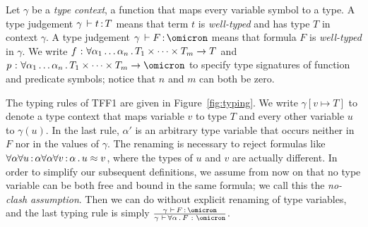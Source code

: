 Let $\gamma$ be a {\em type context}, a function that maps
every variable symbol to a type.
A type judgement $\gamma \,\vdash t \operatorname{:} T$ means that term $t$
is {\em well-typed\/} and has type $T$ in context $\gamma$.
A type judgement $\gamma \,\vdash F \ty \omicron$ means that formula $F$
is {\em well-typed\/} in $\gamma$.
We write $f \,\operatorname{:}\, \forall \alpha_1\dots\alpha_n \,.\,
T_1 \times \dots \times T_m \to T$ and
$p \,\ty\, \forall \alpha_1\dots\alpha_n \,.\,
T_1 \times \dots \times T_m \to \omicron$ to specify
type signatures of function and predicate symbols;
notice that $n$ and $m$ can both be zero.

The typing rules of TFF1 are given in Figure~\ref{fig:typing}.
We write $\gamma[v \mapsto T]$ to denote a type context that maps
variable $v$ to type $T$ and every other variable $u$ to $\gamma(u)$.
In the last rule, $\alpha'$ is an arbitrary type variable that
occurs neither in $F$ nor in the values of $\gamma$.
The renaming is necessary to reject formulas like
$\forall\alpha\forall u\operatorname{:}\alpha\forall\alpha\forall v\operatorname{:}\alpha \,.\,
u \approx v$, where the types of $u$ and $v$ are actually different.
In order to simplify our subsequent definitions, we assume from now on
that no type variable can be both free and bound in the same formula;
we call this the {\em no-clash assumption}.
Then we can do without explicit renaming of type variables,
and the last typing rule is simply
$\frac{\gamma\, \,\vdash\, F \ty \omicron}{
\gamma\, \,\vdash\, \forall \alpha \,.\, F \,\ty\, \omicron}$.


